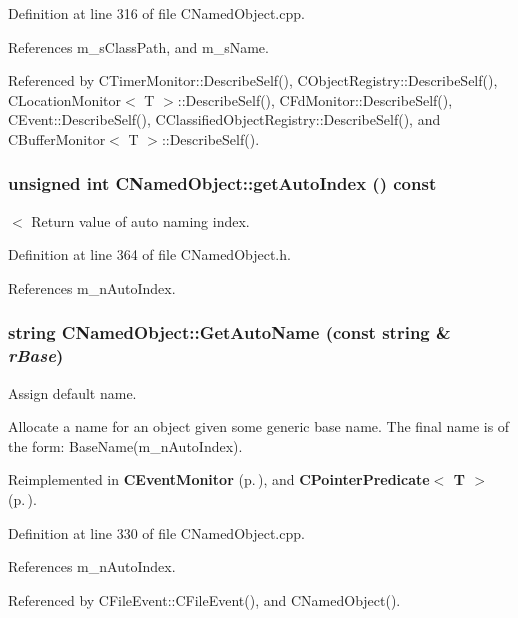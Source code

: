 Definition at line 316 of file CNamed\-Object.cpp.

References m\_\-s\-Class\-Path, and m\_\-s\-Name.

Referenced by CTimer\-Monitor::Describe\-Self(), CObject\-Registry::Describe\-Self(), CLocation\-Monitor$<$ T $>$::Describe\-Self(), CFd\-Monitor::Describe\-Self(), CEvent::Describe\-Self(), CClassified\-Object\-Registry::Describe\-Self(), and CBuffer\-Monitor$<$ T $>$::Describe\-Self().
\subsubsection{\setlength{\rightskip}{0pt plus 5cm}unsigned int CNamed\-Object::get\-Auto\-Index () const\hspace{0.3cm}{\tt  [inline]}}\label{classCNamedObject_a7}


$<$ Return value of auto naming index.



Definition at line 364 of file CNamed\-Object.h.

References m\_\-n\-Auto\-Index.
\subsubsection{\setlength{\rightskip}{0pt plus 5cm}string CNamed\-Object::Get\-Auto\-Name (const string \& {\em r\-Base})\hspace{0.3cm}{\tt  [static, protected]}}\label{classCNamedObject_e0}


Assign default name.

Allocate a name for an object given some generic base name.  The final name is of the form: Base\-Name(m\_\-n\-Auto\-Index). 

Reimplemented in {\bf CEvent\-Monitor} {\rm (p.\,\pageref{classCEventMonitor_e0})}, and {\bf CPointer\-Predicate$<$ T $>$} {\rm (p.\,\pageref{classCPointerPredicate_e0})}.

Definition at line 330 of file CNamed\-Object.cpp.

References m\_\-n\-Auto\-Index.

Referenced by CFile\-Event::CFile\-Event(), and CNamed\-Object().
